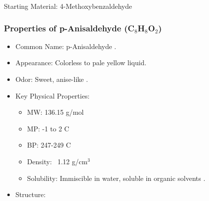 \documentclass[10pt]{beamer}
\begin{document}
\begin{frame}{Starting Material: 4-Methoxybenzaldehyde}
    \frametitle{Properties of p-Anisaldehyde (C$_8$H$_8$O$_2$)}
    \begin{itemize}
        \item Common Name: p-Anisaldehyde \cite{AnisaldehydeFisherSci}.
        \item Appearance: Colorless to pale yellow liquid.
        \item Odor: Sweet, anise-like \cite{AnisaldehydeHMDB}.
        \item Key Physical Properties:
            \begin{itemize}
                \item MW: 136.15 g/mol
                \item MP: -1 to 2 \textdegree C \cite{AnisaldehydeVoloChem}
                \item BP: 247-249 \textdegree C \cite{AnisaldehydeFisherSci}
                \item Density: ~1.12 g/cm$^3$
                \item Solubility: Immiscible in water, soluble in organic solvents \cite{AnisaldehydeFisherSci}.
            \end{itemize}
        \item Structure:
            \begin{center}
            \end{center}
    \end{itemize}
\end{frame}
\end{document}
